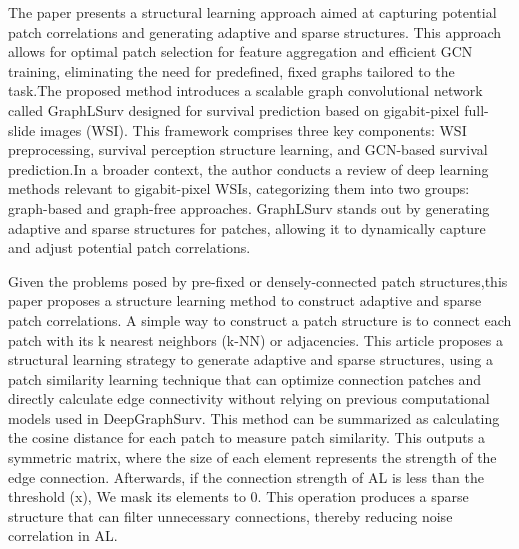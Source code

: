 \documentclass[journal,twoside,web]{ieeecolor}
\begin{document}
The paper\cite{liu2023graphlsurv} presents a structural learning approach aimed at capturing potential patch correlations and generating adaptive and sparse structures. This approach allows for optimal patch selection for feature aggregation and efficient GCN training, eliminating the need for predefined, fixed graphs tailored to the task.The proposed method introduces a scalable graph convolutional network called GraphLSurv designed for survival prediction based on gigabit-pixel full-slide images (WSI). This framework comprises three key components: WSI preprocessing, survival perception structure learning, and GCN-based survival prediction.In a broader context, the author conducts a review of deep learning methods relevant to gigabit-pixel WSIs, categorizing them into two groups: graph-based and graph-free approaches. GraphLSurv stands out by generating adaptive and sparse structures for patches, allowing it to dynamically capture and adjust potential patch correlations.




Given the problems posed by pre-fixed or densely-connected patch structures,this paper\cite{liu2023graphlsurv} proposes a structure learning method to construct adaptive and sparse patch correlations. A simple way to construct a patch structure is to connect each patch with its k nearest neighbors (k-NN) or adjacencies. This article proposes a structural learning strategy to generate adaptive and sparse structures, using a patch similarity learning technique that can optimize connection patches and directly calculate edge connectivity without relying on previous computational models used in DeepGraphSurv. This method can be summarized as calculating the cosine distance for each patch to measure patch similarity. This outputs a symmetric matrix, where the size of each element represents the strength of the edge connection. Afterwards, if the connection strength of AL is less than the threshold (x), We mask its elements to 0. This operation produces a sparse structure that can filter unnecessary connections, thereby reducing noise correlation in AL.

\end{document}
